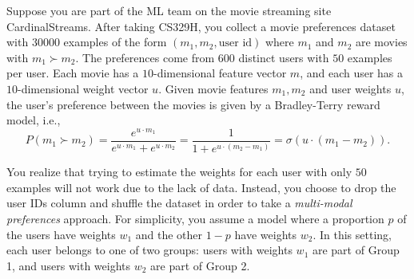 \documentclass[
  letterpaper,
  DIV=11,
  numbers=noendperiod,
  oneside]{scrreprt}
\theoremstyle{remark}
\begin{document}

Suppose you are part of the ML team on the movie streaming site
CardinalStreams. After taking CS329H, you collect a movie preferences
dataset with \(30000\) examples of the form
\((m_1, m_2, \text{user id})\) where \(m_1\) and \(m_2\) are movies with
\(m_1\succ m_2\). The preferences come from \(600\) distinct users with
\(50\) examples per user. Each movie has a \(10\)-dimensional feature
vector \(m\), and each user has a \(10\)-dimensional weight vector
\(u\). Given movie features \(m_1, m_2\) and user weights \(u\), the
user's preference between the movies is given by a Bradley-Terry reward
model, i.e.,
\[P(m_1\succ m_2)=\frac{e^{u\cdot m_1}}{e^{u\cdot m_1} + e^{u\cdot m_2}}=\frac{1}{1+e^{u\cdot (m_2-m_1)}}=\sigma(u\cdot (m_1-m_2)).\]

You realize that trying to estimate the weights for each user with only
\(50\) examples will not work due to the lack of data. Instead, you
choose to drop the user IDs column and shuffle the dataset in order to
take a \emph{multi-modal preferences} approach. For simplicity, you
assume a model where a proportion \(p\) of the users have weights
\(w_1\) and the other \(1-p\) have weights \(w_2\). In this setting,
each user belongs to one of two groups: users with weights \(w_1\) are
part of Group 1, and users with weights \(w_2\) are part of Group 2.
\end{document}

